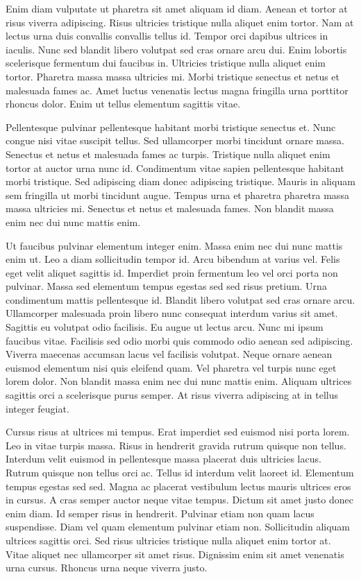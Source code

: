 \documentclass[11pt,a4paper]{article}
\begin{document}
Enim diam vulputate ut pharetra sit amet aliquam id diam. Aenean et tortor at risus viverra adipiscing. Risus ultricies tristique nulla aliquet enim tortor. Nam at lectus urna duis convallis convallis tellus id. Tempor orci dapibus ultrices in iaculis. Nunc sed blandit libero volutpat sed cras ornare arcu dui. Enim lobortis scelerisque fermentum dui faucibus in. Ultricies tristique nulla aliquet enim tortor. Pharetra massa massa ultricies mi. Morbi tristique senectus et netus et malesuada fames ac. Amet luctus venenatis lectus magna fringilla urna porttitor rhoncus dolor. Enim ut tellus elementum sagittis vitae.

Pellentesque pulvinar pellentesque habitant morbi tristique senectus et. Nunc congue nisi vitae suscipit tellus. Sed ullamcorper morbi tincidunt ornare massa. Senectus et netus et malesuada fames ac turpis. Tristique nulla aliquet enim tortor at auctor urna nunc id. Condimentum vitae sapien pellentesque habitant morbi tristique. Sed adipiscing diam donec adipiscing tristique. Mauris in aliquam sem fringilla ut morbi tincidunt augue. Tempus urna et pharetra pharetra massa massa ultricies mi. Senectus et netus et malesuada fames. Non blandit massa enim nec dui nunc mattis enim.

Ut faucibus pulvinar elementum integer enim. Massa enim nec dui nunc mattis enim ut. Leo a diam sollicitudin tempor id. Arcu bibendum at varius vel. Felis eget velit aliquet sagittis id. Imperdiet proin fermentum leo vel orci porta non pulvinar. Massa sed elementum tempus egestas sed sed risus pretium. Urna condimentum mattis pellentesque id. Blandit libero volutpat sed cras ornare arcu. Ullamcorper malesuada proin libero nunc consequat interdum varius sit amet. Sagittis eu volutpat odio facilisis. Eu augue ut lectus arcu. Nunc mi ipsum faucibus vitae. Facilisis sed odio morbi quis commodo odio aenean sed adipiscing. Viverra maecenas accumsan lacus vel facilisis volutpat. Neque ornare aenean euismod elementum nisi quis eleifend quam. Vel pharetra vel turpis nunc eget lorem dolor. Non blandit massa enim nec dui nunc mattis enim. Aliquam ultrices sagittis orci a scelerisque purus semper. At risus viverra adipiscing at in tellus integer feugiat.

Cursus risus at ultrices mi tempus. Erat imperdiet sed euismod nisi porta lorem. Leo in vitae turpis massa. Risus in hendrerit gravida rutrum quisque non tellus. Interdum velit euismod in pellentesque massa placerat duis ultricies lacus. Rutrum quisque non tellus orci ac. Tellus id interdum velit laoreet id. Elementum tempus egestas sed sed. Magna ac placerat vestibulum lectus mauris ultrices eros in cursus. A cras semper auctor neque vitae tempus. Dictum sit amet justo donec enim diam. Id semper risus in hendrerit. Pulvinar etiam non quam lacus suspendisse. Diam vel quam elementum pulvinar etiam non. Sollicitudin aliquam ultrices sagittis orci. Sed risus ultricies tristique nulla aliquet enim tortor at. Vitae aliquet nec ullamcorper sit amet risus. Dignissim enim sit amet venenatis urna cursus. Rhoncus urna neque viverra justo.
\end{document}
